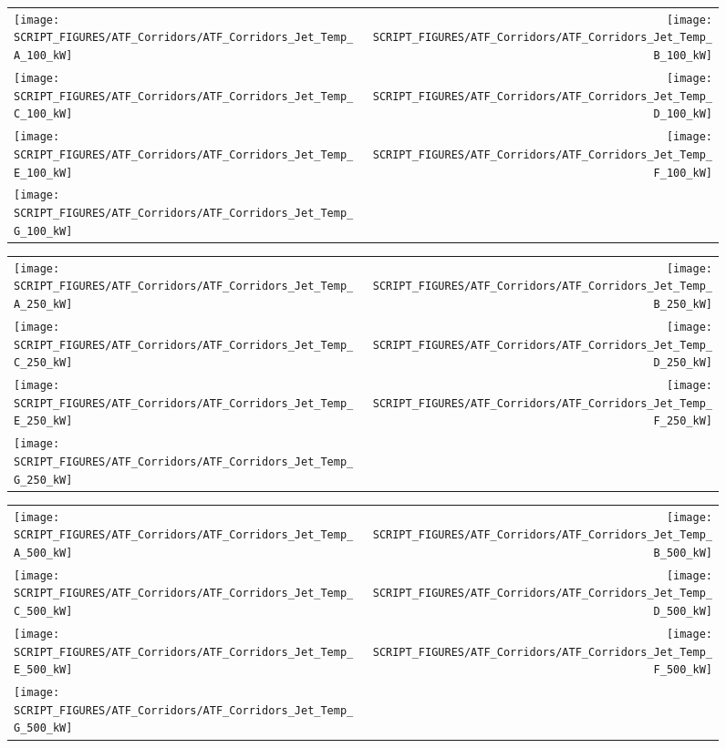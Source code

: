 \begin{figure}[!ht]
\begin{tabular*}{\textwidth}{l@{\extracolsep{\fill}}r}
\texttt{[image: SCRIPT\_FIGURES/ATF\_Corridors/ATF\_Corridors\_Jet\_Temp\_A\_100\_kW]} &
\texttt{[image: SCRIPT\_FIGURES/ATF\_Corridors/ATF\_Corridors\_Jet\_Temp\_B\_100\_kW]} \\
\texttt{[image: SCRIPT\_FIGURES/ATF\_Corridors/ATF\_Corridors\_Jet\_Temp\_C\_100\_kW]} &
\texttt{[image: SCRIPT\_FIGURES/ATF\_Corridors/ATF\_Corridors\_Jet\_Temp\_D\_100\_kW]} \\
\texttt{[image: SCRIPT\_FIGURES/ATF\_Corridors/ATF\_Corridors\_Jet\_Temp\_E\_100\_kW]} &
\texttt{[image: SCRIPT\_FIGURES/ATF\_Corridors/ATF\_Corridors\_Jet\_Temp\_F\_100\_kW]} \\
\texttt{[image: SCRIPT\_FIGURES/ATF\_Corridors/ATF\_Corridors\_Jet\_Temp\_G\_100\_kW]} &
\end{tabular*}
\label{ATF_Corridors_Jet_Temp_100_kW}
\end{figure}

\begin{figure}[!ht]
\begin{tabular*}{\textwidth}{l@{\extracolsep{\fill}}r}
\texttt{[image: SCRIPT\_FIGURES/ATF\_Corridors/ATF\_Corridors\_Jet\_Temp\_A\_250\_kW]} &
\texttt{[image: SCRIPT\_FIGURES/ATF\_Corridors/ATF\_Corridors\_Jet\_Temp\_B\_250\_kW]} \\
\texttt{[image: SCRIPT\_FIGURES/ATF\_Corridors/ATF\_Corridors\_Jet\_Temp\_C\_250\_kW]} &
\texttt{[image: SCRIPT\_FIGURES/ATF\_Corridors/ATF\_Corridors\_Jet\_Temp\_D\_250\_kW]} \\
\texttt{[image: SCRIPT\_FIGURES/ATF\_Corridors/ATF\_Corridors\_Jet\_Temp\_E\_250\_kW]} &
\texttt{[image: SCRIPT\_FIGURES/ATF\_Corridors/ATF\_Corridors\_Jet\_Temp\_F\_250\_kW]} \\
\texttt{[image: SCRIPT\_FIGURES/ATF\_Corridors/ATF\_Corridors\_Jet\_Temp\_G\_250\_kW]} &
\end{tabular*}
\label{ATF_Corridors_Jet_Temp_250_kW}
\end{figure}

\begin{figure}[!ht]
\begin{tabular*}{\textwidth}{l@{\extracolsep{\fill}}r}
\texttt{[image: SCRIPT\_FIGURES/ATF\_Corridors/ATF\_Corridors\_Jet\_Temp\_A\_500\_kW]} &
\texttt{[image: SCRIPT\_FIGURES/ATF\_Corridors/ATF\_Corridors\_Jet\_Temp\_B\_500\_kW]} \\
\texttt{[image: SCRIPT\_FIGURES/ATF\_Corridors/ATF\_Corridors\_Jet\_Temp\_C\_500\_kW]} &
\texttt{[image: SCRIPT\_FIGURES/ATF\_Corridors/ATF\_Corridors\_Jet\_Temp\_D\_500\_kW]} \\
\texttt{[image: SCRIPT\_FIGURES/ATF\_Corridors/ATF\_Corridors\_Jet\_Temp\_E\_500\_kW]} &
\texttt{[image: SCRIPT\_FIGURES/ATF\_Corridors/ATF\_Corridors\_Jet\_Temp\_F\_500\_kW]} \\
\texttt{[image: SCRIPT\_FIGURES/ATF\_Corridors/ATF\_Corridors\_Jet\_Temp\_G\_500\_kW]} &
\end{tabular*}
\label{ATF_Corridors_Jet_Temp_500_kW}
\end{figure}

